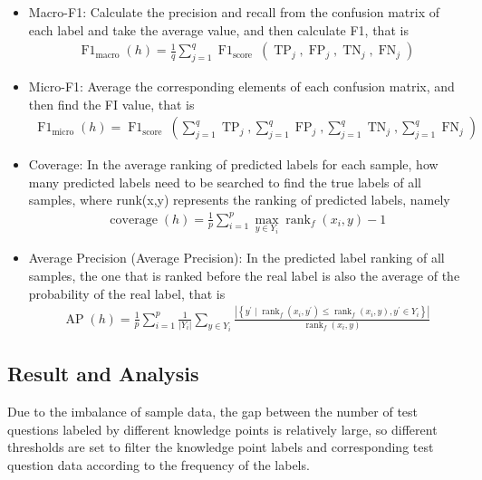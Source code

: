 \begin{itemize}
	\item Macro-F1: Calculate the precision and recall from the confusion matrix of each label and take the average value, and then calculate F1, that is
	      \begin{align}
		      \operatorname{F1}_{\text {macro}}(h)=\frac{1}{q} \sum_{j=1}^{q} \operatorname{F1}_{\text {score }}\left(\operatorname{TP}_{j}, \operatorname{FP}_{j}, \operatorname{TN}_{j}, \operatorname{FN}_{j}\right)
	      \end{align}
	\item Micro-F1: Average the corresponding elements of each confusion matrix, and then find the FI value, that is
	      \begin{align}
		      \operatorname{F1}_{\text {micro}}(h)=\operatorname{F1}_{\text {score }}\left(\sum_{j=1}^{q} \operatorname{TP}_{j}, \sum_{j=1}^{q} \operatorname{FP}_{j}, \sum_{j=1}^{q} \operatorname{TN}_{j}, \sum_{j=1}^{q} \operatorname{FN}_{j}\right)
	      \end{align}
	\item Coverage: In the average ranking of predicted labels for each sample, how many predicted labels need to be searched to find the true labels of all samples, where runk(x,y) represents the ranking of predicted labels, namely
	      \begin{align}
		      \operatorname{coverage}(h)=\frac{1}{p} \sum_{i=1}^{p} \max _{y \in Y_{i}} \operatorname{rank}_{f}\left(x_{i}, y\right)-1
	      \end{align}
	\item Average Precision (Average Precision): In the predicted label ranking of all samples, the one that is ranked before the real label is also the average of the probability of the real label, that is
	      \begin{align}
		      \operatorname{AP}(h)=\frac{1}{p} \sum_{i=1}^{p} \frac{1}{\left|Y_{i}\right|} \sum_{y \in Y_{i}} \frac{\left|\left\{y^{\prime} \mid \operatorname{rank}_{f}\left(x_{i}, y^{\prime}\right) \leq \operatorname{rank}_{f}\left(x_{i}, y\right), y^{\prime} \in Y_{i}\right\}\right|}{\operatorname{rank}_{f}\left(x_{i}, y\right)}
	      \end{align}
\end{itemize}
\subsection{Result and Analysis}
Due to the imbalance of sample data, the gap between the number of test questions labeled by different knowledge points is relatively large, so different thresholds are set to filter the knowledge point labels and corresponding test question data according to the frequency of the labels.

